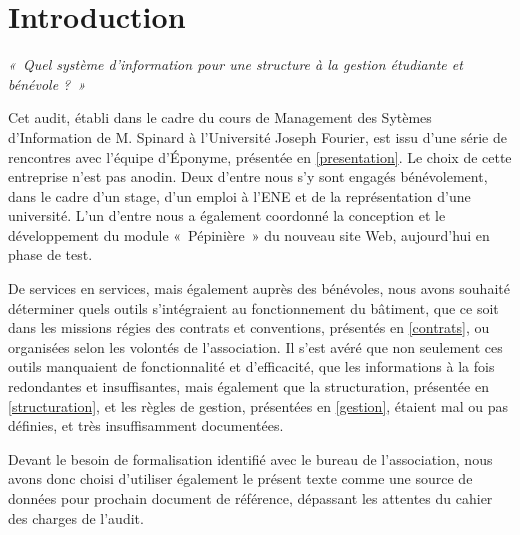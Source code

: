 \section*{Introduction}

\textit{«~Quel système d'information pour une structure à la gestion
étudiante et bénévole ?~»}

Cet audit, établi dans le cadre du cours de Management des Sytèmes
d'Information de M. Spinard à l'Université Joseph Fourier, est issu d'une série
de rencontres avec l'équipe d'Éponyme, présentée en \ref{presentation}.
Le choix de cette entreprise n'est pas anodin. Deux d'entre nous s'y sont
engagés bénévolement, dans le cadre d'un stage, d'un emploi à l'ENE et de la
représentation d'une université. L'un d'entre nous a également coordonné la
conception et le développement du module «~Pépinière~» du nouveau site Web,
aujourd'hui en phase de test.

De services en services, mais également auprès des bénévoles, nous
avons souhaité déterminer quels outils s'intégraient au fonctionnement du
bâtiment, que ce soit dans les missions régies des contrats et conventions,
présentés en \ref{contrats}, ou organisées selon les volontés de l'association.
Il s'est avéré que non seulement ces outils manquaient de fonctionnalité et
d'efficacité, que les informations à la fois redondantes et insuffisantes,
mais également que la structuration, présentée en \ref{structuration}, et les
règles de gestion, présentées en \ref{gestion}, étaient mal ou pas définies,
et très insuffisamment documentées.

Devant le besoin de formalisation identifié avec le bureau de l'association,
nous avons donc choisi d'utiliser également le présent texte comme une source
de données pour prochain document de référence, dépassant les attentes du
cahier des charges de l'audit.
